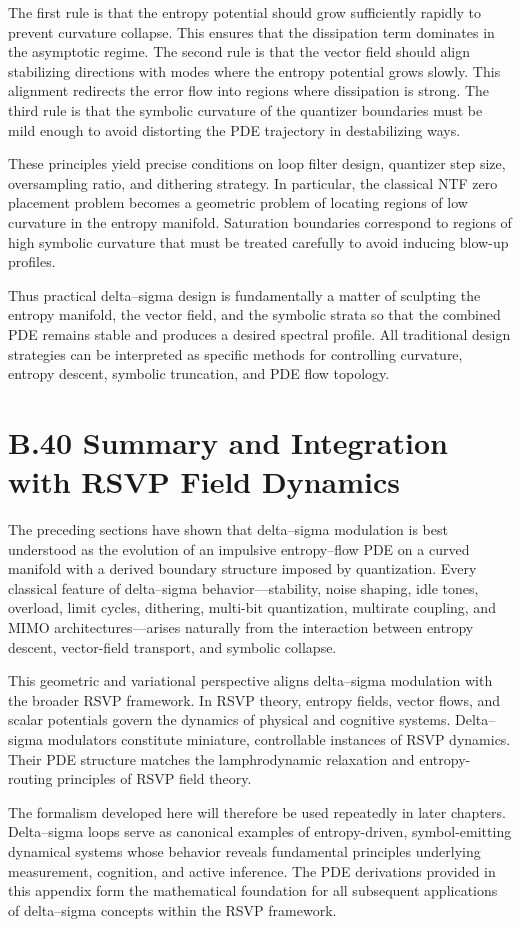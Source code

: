 The first rule is that the entropy potential should grow sufficiently rapidly to prevent curvature collapse. This ensures that the dissipation term dominates in the asymptotic regime. The second rule is that the vector field should align stabilizing directions with modes where the entropy potential grows slowly. This alignment redirects the error flow into regions where dissipation is strong. The third rule is that the symbolic curvature of the quantizer boundaries must be mild enough to avoid distorting the PDE trajectory in destabilizing ways.

These principles yield precise conditions on loop filter design, quantizer step size, oversampling ratio, and dithering strategy. In particular, the classical NTF zero placement problem becomes a geometric problem of locating regions of low curvature in the entropy manifold. Saturation boundaries correspond to regions of high symbolic curvature that must be treated carefully to avoid inducing blow-up profiles.

Thus practical delta–sigma design is fundamentally a matter of sculpting the entropy manifold, the vector field, and the symbolic strata so that the combined PDE remains stable and produces a desired spectral profile. All traditional design strategies can be interpreted as specific methods for controlling curvature, entropy descent, symbolic truncation, and PDE flow topology.

\section{B.40 Summary and Integration with RSVP Field Dynamics}

The preceding sections have shown that delta–sigma modulation is best understood as the evolution of an impulsive entropy–flow PDE on a curved manifold with a derived boundary structure imposed by quantization. Every classical feature of delta–sigma behavior—stability, noise shaping, idle tones, overload, limit cycles, dithering, multi-bit quantization, multirate coupling, and MIMO architectures—arises naturally from the interaction between entropy descent, vector-field transport, and symbolic collapse.

This geometric and variational perspective aligns delta–sigma modulation with the broader RSVP framework. In RSVP theory, entropy fields, vector flows, and scalar potentials govern the dynamics of physical and cognitive systems. Delta–sigma modulators constitute miniature, controllable instances of RSVP dynamics. Their PDE structure matches the lamphrodynamic relaxation and entropy-routing principles of RSVP field theory.

The formalism developed here will therefore be used repeatedly in later chapters. Delta–sigma loops serve as canonical examples of entropy-driven, symbol-emitting dynamical systems whose behavior reveals fundamental principles underlying measurement, cognition, and active inference. The PDE derivations provided in this appendix form the mathematical foundation for all subsequent applications of delta–sigma concepts within the RSVP framework.
